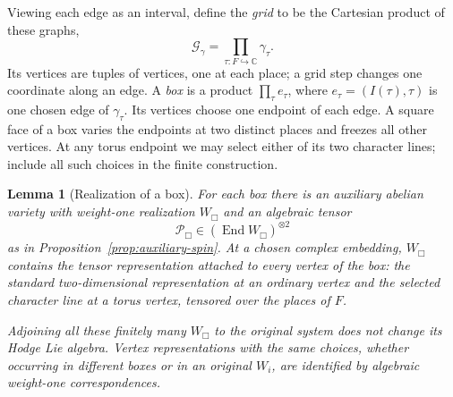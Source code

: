 \documentclass[11pt]{article}
\numberwithin{equation}{section}
\newtheorem{lemma}[theorem]{Lemma}
\theoremstyle{definition}
\theoremstyle{remark}
\newcommand{\C}{\mathbb C}
\DeclareMathOperator{\End}{End}
\begin{document}
Viewing each edge as an interval, define the \emph{grid} to be the
Cartesian product of these graphs,
\[
 \mathscr G_\gamma=
       \prod_{\tau:F\hookrightarrow\C}\gamma_\tau.
\]
Its vertices are tuples of vertices, one at each place; a grid step
changes one coordinate along an edge.  A \emph{box} is a product
\(\prod_\tau e_\tau\), where $e_\tau=(I(\tau),\tau)$ is one
chosen edge of $\gamma_\tau$.  Its vertices choose one endpoint of
each edge.  A square face of a box varies the endpoints at two distinct
places and freezes all other vertices.  At any torus endpoint we may
select either of its two character lines; include all such choices in
the finite construction.

\begin{lemma}[Realization of a box]\label{lem:mixed-box}
For each box there is an auxiliary abelian variety with weight-one
realization $W_{\Box}$ and an algebraic tensor
\[
 \mathcal P_{\Box}\in(\End W_{\Box})^{\otimes2}
\]
as in Proposition~\ref{prop:auxiliary-spin}.  At a chosen complex
embedding, $W_{\Box}$ contains the tensor representation attached
to every vertex of the box: the standard two-dimensional representation
at an ordinary vertex and the selected character line at a torus
vertex, tensored over the places of $F$.

Adjoining all these finitely many $W_{\Box}$ to the original system
does not change its Hodge Lie algebra.  Vertex representations with
the same choices, whether occurring in different boxes or in an
original $W_i$, are identified by algebraic weight-one correspondences.
\end{lemma}
\end{document}
